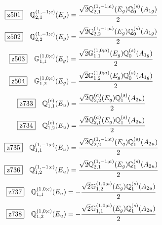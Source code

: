 \documentclass[fleqn,10pt,landscape]{jsarticle}
\begin{document}
\begin{dmath*}
\hspace*{3mm}\fbox{z501}\quad \mathbb{Q}_{2,1}^{(1,-1;c)}(E_{g})=\frac{\sqrt{2} \mathbb{Q}_{2,1}^{(1,-1;a)}(E_{g}) \mathbb{Q}_{0}^{(s)}(A_{1g})}{2}
\end{dmath*}
\begin{dmath*}
\hspace*{3mm}\fbox{z502}\quad \mathbb{Q}_{2,2}^{(1,-1;c)}(E_{g})=\frac{\sqrt{2} \mathbb{Q}_{2,2}^{(1,-1;a)}(E_{g}) \mathbb{Q}_{0}^{(s)}(A_{1g})}{2}
\end{dmath*}
\begin{dmath*}
\hspace*{3mm}\fbox{z503}\quad \mathbb{G}_{1,1}^{(1,0;c)}(E_{g})=\frac{\sqrt{2} \mathbb{G}_{1,1}^{(1,0;a)}(E_{g}) \mathbb{Q}_{0}^{(s)}(A_{1g})}{2}
\end{dmath*}
\begin{dmath*}
\hspace*{3mm}\fbox{z504}\quad \mathbb{G}_{1,2}^{(1,0;c)}(E_{g})=\frac{\sqrt{2} \mathbb{G}_{1,2}^{(1,0;a)}(E_{g}) \mathbb{Q}_{0}^{(s)}(A_{1g})}{2}
\end{dmath*}
\begin{dmath*}
\hspace*{3mm}\fbox{z733}\quad \mathbb{Q}_{1,1}^{(c)}(E_{u})=\frac{\sqrt{2} \mathbb{Q}_{2,2}^{(a)}(E_{g}) \mathbb{Q}_{1}^{(s)}(A_{2u})}{2}
\end{dmath*}
\begin{dmath*}
\hspace*{3mm}\fbox{z734}\quad \mathbb{Q}_{1,2}^{(c)}(E_{u})=\frac{\sqrt{2} \mathbb{Q}_{2,1}^{(a)}(E_{g}) \mathbb{Q}_{1}^{(s)}(A_{2u})}{2}
\end{dmath*}
\begin{dmath*}
\hspace*{3mm}\fbox{z735}\quad \mathbb{Q}_{1,1}^{(1,-1;c)}(E_{u})=\frac{\sqrt{2} \mathbb{Q}_{2,2}^{(1,-1;a)}(E_{g}) \mathbb{Q}_{1}^{(s)}(A_{2u})}{2}
\end{dmath*}
\begin{dmath*}
\hspace*{3mm}\fbox{z736}\quad \mathbb{Q}_{1,2}^{(1,-1;c)}(E_{u})=\frac{\sqrt{2} \mathbb{Q}_{2,1}^{(1,-1;a)}(E_{g}) \mathbb{Q}_{1}^{(s)}(A_{2u})}{2}
\end{dmath*}
\begin{dmath*}
\hspace*{3mm}\fbox{z737}\quad \mathbb{Q}_{1,1}^{(1,0;c)}(E_{u})=- \frac{\sqrt{2} \mathbb{G}_{1,2}^{(1,0;a)}(E_{g}) \mathbb{Q}_{1}^{(s)}(A_{2u})}{2}
\end{dmath*}
\begin{dmath*}
\hspace*{3mm}\fbox{z738}\quad \mathbb{Q}_{1,2}^{(1,0;c)}(E_{u})=- \frac{\sqrt{2} \mathbb{G}_{1,1}^{(1,0;a)}(E_{g}) \mathbb{Q}_{1}^{(s)}(A_{2u})}{2}
\end{dmath*}
\vspace{5mm}
\end{document}
